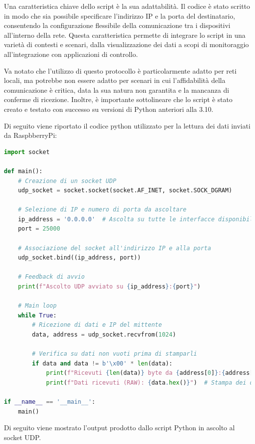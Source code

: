 \documentclass[titlepage]{report}
\begin{document}
	Una caratteristica chiave dello script è la sua adattabilità. Il codice è stato scritto in modo che sia possibile specificare l'indirizzo IP e la porta del destinatario, consentendo la configurazione flessibile della comunicazione tra i dispositivi all'interno della rete. Questa caratteristica permette di integrare lo script in una varietà di contesti e scenari, dalla visualizzazione dei dati a scopi di monitoraggio all'integrazione con applicazioni di controllo.

	Va notato che l'utilizzo di questo protocollo è particolarmente adatto per reti locali, ma potrebbe non essere adatto per scenari in cui l'affidabilità della comunicazione è critica, data la sua natura non garantita e la mancanza di conferme di ricezione. Inoltre, è importante sottolineare che lo script è stato creato e testato con successo su versioni di Python anteriori alla 3.10. \par

	Di seguito viene riportato il codice python utilizzato per la lettura dei dati inviati da RaspbberryPi:

	\begin{lstlisting}[label={lst:udp_listener.py},caption={Script \texttt{udp\_listener.py} per l'ascolto della porta UDP utilizzata dal RaspberryPi}, language=python]
import socket

def main():
	# Creazione di un socket UDP
	udp_socket = socket.socket(socket.AF_INET, socket.SOCK_DGRAM)

	# Selezione di IP e numero di porta da ascoltare
	ip_address = '0.0.0.0'  # Ascolta su tutte le interfacce disponibili
	port = 25000

	# Associazione del socket all'indirizzo IP e alla porta
	udp_socket.bind((ip_address, port))

	# Feedback di avvio
	print(f"Ascolto UDP avviato su {ip_address}:{port}")

	# Main loop
	while True:
		# Ricezione di dati e IP del mittente
		data, address = udp_socket.recvfrom(1024)

		# Verifica su dati non vuoti prima di stamparli
		if data and data != b'\x00' * len(data):
			print(f"Ricevuti {len(data)} byte da {address[0]}:{address[1]}")
			print(f"Dati ricevuti (RAW): {data.hex()}")  # Stampa dei dati in formato esadecimale (hex)

if __name__ == '__main__':
    main()
	\end{lstlisting}

	Di seguito viene mostrato l'output prodotto dallo script Python in ascolto al socket UDP.
\end{document}
